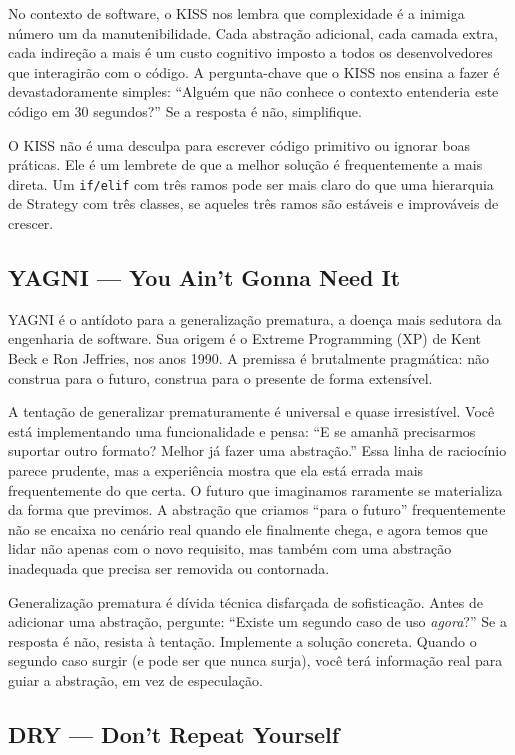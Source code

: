 No contexto de software, o KISS nos lembra que complexidade é a inimiga número
um da manutenibilidade. Cada abstração adicional, cada camada extra, cada
indireção a mais é um custo cognitivo imposto a todos os desenvolvedores que
interagirão com o código. A pergunta-chave que o KISS nos ensina a fazer é
devastadoramente simples: ``Alguém que não conhece o contexto entenderia este
código em 30 segundos?'' Se a resposta é não, simplifique.

O KISS não é uma desculpa para escrever código primitivo ou ignorar boas
práticas. Ele é um lembrete de que a melhor solução é frequentemente a mais
direta. Um \texttt{if/elif} com três ramos pode ser mais claro do que uma
hierarquia de Strategy com três classes, se aqueles três ramos são estáveis
e improváveis de crescer.

\subsection{YAGNI --- You Ain't Gonna Need It}

YAGNI é o antídoto para a generalização prematura, a doença mais sedutora da
engenharia de software. Sua origem é o Extreme Programming (XP) de Kent Beck
e Ron Jeffries, nos anos 1990. A premissa é brutalmente pragmática: não
construa para o futuro, construa para o presente de forma extensível.

A tentação de generalizar prematuramente é universal e quase irresistível.
Você está implementando uma funcionalidade e pensa: ``E se amanhã precisarmos
suportar outro formato? Melhor já fazer uma abstração.'' Essa linha de
raciocínio parece prudente, mas a experiência mostra que ela está errada mais
frequentemente do que certa. O futuro que imaginamos raramente se materializa
da forma que previmos. A abstração que criamos ``para o futuro'' frequentemente
não se encaixa no cenário real quando ele finalmente chega, e agora temos que
lidar não apenas com o novo requisito, mas também com uma abstração inadequada
que precisa ser removida ou contornada.

Generalização prematura é dívida técnica disfarçada de sofisticação. Antes de
adicionar uma abstração, pergunte: ``Existe um segundo caso de uso
\emph{agora}?'' Se a resposta é não, resista à tentação. Implemente a solução
concreta. Quando o segundo caso surgir (e pode ser que nunca surja),
você terá informação real para guiar a abstração, em vez de especulação.

\subsection{DRY --- Don't Repeat Yourself}

